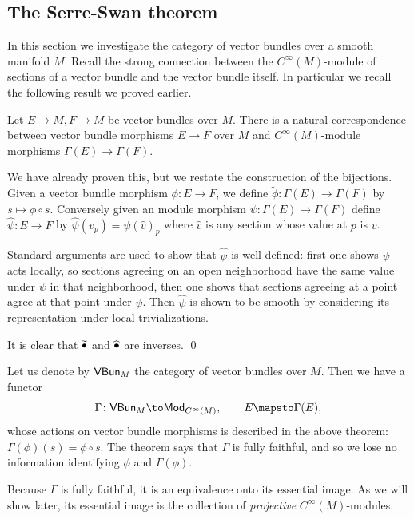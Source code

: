 \eproof

\subsection{The Serre-Swan theorem}

In this section we investigate the category of vector bundles over a smooth manifold $M$.
Recall the strong connection between the $C^\infty(M)$-module of sections of a vector bundle and the vector bundle itself.
In particular we recall the following result we proved earlier.

\bthrm

    Let $E\to M,F\to M$ be vector bundles over $M$.
    There is a natural correspondence between vector bundle morphisms $E\to F$ over $M$ and $C^\infty(M)$-module morphisms $\Gamma(E)\to\Gamma(F)$.

\ethrm

\bproof

    We have already proven this, but we restate the construction of the bijections.
    Given a vector bundle morphism $\phi\colon E\to F$, we define $\tilde\phi\colon\Gamma(E)\to\Gamma(F)$ by $s\mapsto\phi\circ s$.
    Conversely given an module morphism $\psi\colon\Gamma(E)\to\Gamma(F)$ define $\hat\psi\colon E\to F$ by $\hat\psi(v_p)=\psi(\hat v)_p$ where $\hat v$ is any
    section whose value at $p$ is $v$.

    Standard arguments are used to show that $\hat\psi$ is well-defined: first one shows $\psi$ acts locally, so sections agreeing on an open neighborhood
    have the same value under $\psi$ in that neighborhood, then one shows that sections agreeing at a point agree at that point under $\psi$.
    Then $\hat\psi$ is shown to be smooth by considering its representation under local trivializations.

    It is clear that $\widetilde{\bullet}$ and $\widehat{\bullet}$ are inverses.
    \qed

\eproof

Let us denote by ${\sf VBun}_M$ the category of vector bundles over $M$.
Then we have a functor
$$ \Gamma\colon \VBun_M \to \Mod_{C^\infty(M)},\qquad E\mapsto\Gamma(E) , $$
whose actions on vector bundle morphisms is described in the above theorem: $\Gamma(\phi)(s)=\phi\circ s$.
The theorem says that $\Gamma$ is fully faithful, and so we lose no information identifying $\phi$ and $\Gamma(\phi)$.

Because $\Gamma$ is fully faithful, it is an equivalence onto its essential image.
As we will show later, its essential image is the collection of {\it projective\/} $C^\infty(M)$-modules.

